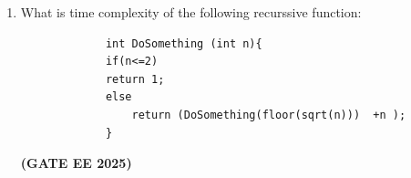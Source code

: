 \documentclass[journal,12pt,onecolumn]{IEEEtran}
\theoremstyle{remark}
\begin{document}
\begin {center}
\begin{enumerate}
\begin{enumerate}
         \end{enumerate}
         \hfill \textbf{(GATE EE 2025)}
         \item What is time complexity of the following recurssive function: 
         \begin{verbatim}
             int DoSomething (int n){
             if(n<=2) 
             return 1;
             else
                 return (DoSomething(floor(sqrt(n)))  +n );
             }
         \end{verbatim}
         \begin{enumerate}
         \end{enumerate}
   
        \hfill \textbf{(GATE EE 2025)}
         

\end{enumerate}
\end{center}
\end{document}
